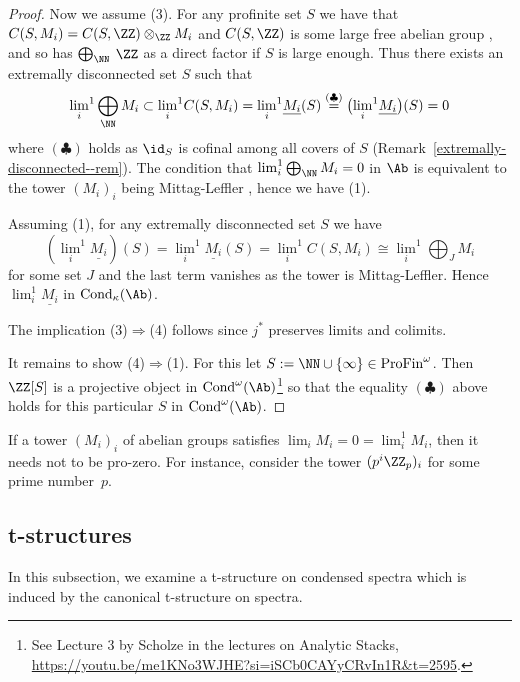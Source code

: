\documentclass[colorinlistoftodos,article,11pt,reqno]{article}
\newcommand{\Cond}{\textup{Cond}}
\newcommand{\ProFin}{\textup{ProFin}}
\begin{document}
\begin{appendix}
\begin{proof}
Now we assume (3). For any profinite set $S$ we have that $C(S,M_i)
= C(S,\ZZ) \otimes_\ZZ M_i$ and $C(S,\ZZ)$ is some large free abelian group \cite[Thm. 5.4]{condensed}, and so has $\bigoplus_\NN$ $\ZZ$ as a direct factor if $S$ is large enough. 
Thus there exists an extremally disconnected set $S$ such that 
\[
{\lim_i}^1 \bigoplus_\NN M_i \subset {\lim_i}^1C(S,M_i) = {\lim_i}^1 \underline{M_i}(S) \overset{(\clubsuit)}{=} \bigl( {\lim_i}^1\underline{M_i} \bigr)(S)=0
\]
where $(\clubsuit)$ holds as $\id_S$ is cofinal among all covers of $S$ (Remark~\ref{extremally-disconnected--rem}). The condition that $\lim_i^1\bigoplus_\NN M_i=0$ in $\Ab$ is equivalent to the tower $(M_i)_i$ being Mittag-Leffler \cite[Cor. 6]{emmanouil}, hence we have (1).

Assuming (1), for any extremally disconnected set $S$ we have 
\[
({\lim_i}^1\underline{M_i})(S) = {\lim_i}^1\underline{M_i}(S) = {\lim_i}^1C(S,M_i) \cong {\lim_i}^1\bigoplus_J M_i
\]
for some set $J$ and the last term vanishes as the tower is Mittag-Leffler. Hence $\lim_i^1\underline{M_i}$ in $\Cond_\kappa(\Ab)$.

The implication (3)$\Rightarrow$(4) follows since $j^*$ preserves limits and colimits.

It remains to show (4)$\Rightarrow$(1). For this let $S:=\NN\cup\{\infty\}\in\ProFin^\omega$. Then $\ZZ[S]$ is a projective object in $\Cond^\omega(\Ab)$\footnote{See Lecture 3 by Scholze in the lectures on Analytic Stacks, \url{https://youtu.be/me1KNo3WJHE?si=iSCb0CAYyCRvIn1R&t=2595}.} so that the equality $(\clubsuit)$ above holds for this particular $S$ in $\Cond^\omega(\Ab)$.
\end{proof}

\begin{example}
If a tower $(M_i)_i$ of abelian groups satisfies $\lim_iM_i=0=\lim_i^1M_i$, then it needs not to be pro-zero. For instance, consider the tower $(p^i\ZZ_p)_i$ for some prime number~$p$.
\end{example}




\subsection{t-structures}
In this subsection, we examine a t-structure on condensed spectra which is induced by the canonical t-structure on spectra.


\end{appendix}
\end{document}
